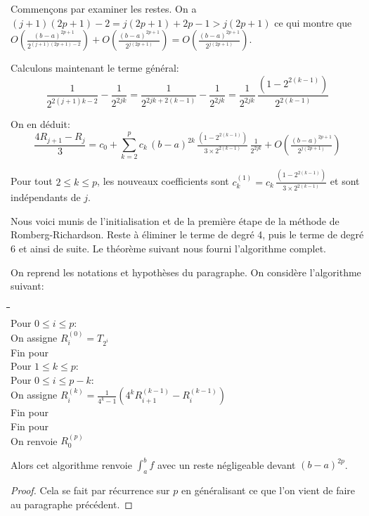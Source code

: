 Commençons par examiner les restes. On a $(j+1)(2p+1) - 2 = j(2p+1) + 2p-1 > j(2p+1)$ ce qui montre que $O\left (\tfrac{(b-a)^{2p+1}}{2^{(j+1)(2p+1)-2}}\right ) + O\left (\tfrac{(b-a)^{2p+1}}{2^{j(2p+1)}} \right ) = O\left (\tfrac{(b-a)^{2p+1}}{2^{j(2p+1)}} \right )$.

\medskip
Calculons maintenant le terme général:
\[
\frac{1}{2^{2(j+1)k-2}}-\frac{1}{2^{2jk}} = \frac{1}{2^{2jk + 2(k-1)}} - \frac{1}{2^{2jk}} = \frac{1}{2^{2jk}} \, \frac{\left ( 1-2^{2(k-1)}\right ) }{2^{2(k-1)}} 
\]

On en déduit:
\[
\frac{4R_{j+1} - R_j}{3} = c_0 + \displaystyle{\sum_{k=2}^p} c_k \, (b-a)^{2k} \, \tfrac{\left ( 1-2^{2(k-1)}\right ) }{3 \times 2^{2(k-1)}}  \, \tfrac{1}{2^{2jk}} + O\left (\tfrac{(b-a)^{2p+1}}{2^{j(2p+1)}} \right )
\]

Pour tout $2 \leq k \leq p$, les nouveaux coefficients sont $c_k^{(1)} = c_k \, \tfrac{\left ( 1-2^{2(k-1)}\right ) }{3 \times 2^{2(k-1)}}$ et sont indépendants de $j$.

\medskip
Nous voici munis de l'initialisation et de la première étape de la méthode de Romberg-Richardson. Reste à éliminer le terme de degré 4, puis le terme de degré 6 et ainsi de suite. Le théorème suivant nous fourni l'algorithme complet.

\begin{theo}
On reprend les notations et hypothèses du paragraphe. On considère l'algorithme suivant:
\begin{tabbing}
\qquad\=\qquad\=\qquad\=\qquad\=\qquad\=\qquad\\
Pour $0 \leq i \leq p$: \\
\>On assigne $R_i^{(0)} = T_{2^i}$ \\
Fin pour \\
Pour $1 \leq k \leq p$: \\
\>Pour $0 \leq i \leq p-k$: \\
\>\>On assigne $R_i^{(k)} = \frac{1}{4^{k}-1} \left ( 4^k R_{i+1}^{(k-1)}-R_{i}^{(k-1)}\right )$ \\
\>Fin pour \\
Fin pour \\
On renvoie $R_0^{(p)}$
\end{tabbing}

Alors cet algorithme renvoie $\displaystyle{\int_a^b} f$ avec un reste négligeable devant $(b-a)^{2p}$.
\end{theo}

 
\begin{proof}
Cela se fait par récurrence sur $p$ en généralisant ce que l'on vient de faire au paragraphe précédent.
\end{proof}



